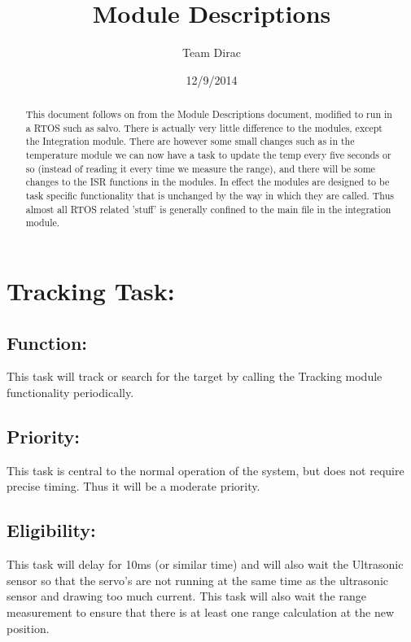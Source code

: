\documentclass[]{article}
\title{Module Descriptions}
\author{Team Dirac}
\date{12/9/2014}
\begin{document}
\maketitle

\newpage

\begin{abstract}
	This document follows on from the Module Descriptions document, modified to run in a RTOS such as salvo. There is actually very little difference to the modules, except the Integration module. There are however some small changes such as in the temperature module we can now have a task to update the temp every five seconds or so (instead of reading it every time we measure the range), and there will be some changes to the ISR functions in the modules. \newline
	In effect the modules are designed to be task specific functionality that is unchanged by the way in which they are called. Thus almost all RTOS related 'stuff' is generally confined to the main file in the integration module.
\end{abstract}

\newpage
\section{Tracking Task:}

\subsection{Function:}
This task will track or search for the target by calling the Tracking module functionality periodically.

\subsection{Priority:}
This task is central to the normal operation of the system, but does not require precise timing. Thus it will be a moderate priority.

\subsection{Eligibility:}
This task will delay for 10ms (or similar time) and will also wait the Ultrasonic sensor so that the servo's are not running at the same time as the ultrasonic sensor and drawing too much current. This task will also wait the range measurement to ensure that there is at least one range calculation at the new position.
\end{document}
